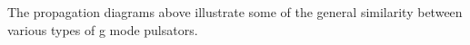 The propagation diagrams above illustrate some of the general similarity between various types of g mode pulsators.